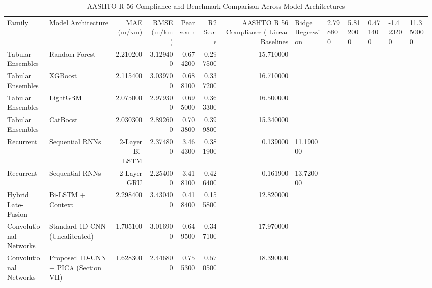 \begin{table}
\caption{AASHTO R 56 Compliance and Benchmark Comparison Across Model Architectures}
\label{tab:aashto_compliance}
\begin{tabular}{llrrrrr}
\toprule
Family & Model Architecture & MAE (m/km) & RMSE (m/km) & Pearson r & R2 Score & AASHTO R 56 Compliance (%
\midrule
Linear Baselines & Ridge Regression & 2.798800 & 5.812000 & 0.471400 & -1.423200 & 11.350000 \\
Tabular Ensembles & Random Forest & 2.210200 & 3.129400 & 0.674200 & 0.297500 & 15.710000 \\
Tabular Ensembles & XGBoost & 2.115400 & 3.039700 & 0.688100 & 0.337200 & 16.710000 \\
Tabular Ensembles & LightGBM & 2.075000 & 2.979300 & 0.695000 & 0.363300 & 16.500000 \\
Tabular Ensembles & CatBoost & 2.030300 & 2.892600 & 0.703800 & 0.399800 & 15.340000 \\
Recurrent & Sequential RNNs & 2-Layer Bi-LSTM & 2.374800 & 3.464300 & 0.381900 & 0.139000 & 11.190000 \\
Recurrent & Sequential RNNs & 2-Layer GRU & 2.254000 & 3.418100 & 0.426400 & 0.161900 & 13.720000 \\
Hybrid Late-Fusion & Bi-LSTM + Context & 2.298400 & 3.430400 & 0.418400 & 0.155800 & 12.820000 \\
Convolutional Networks & Standard 1D-CNN (Uncalibrated) & 1.705100 & 3.016900 & 0.649500 & 0.347100 & 17.970000 \\
Convolutional Networks & Proposed 1D-CNN + PICA (Section VII) & 1.628300 & 2.446800 & 0.755300 & 0.570500 & 18.390000 \\
\bottomrule
\end{tabular}
\end{table}
